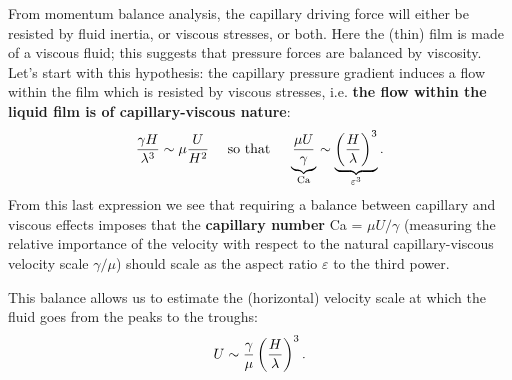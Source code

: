 From momentum balance analysis, the capillary driving force will either be resisted by fluid inertia, or viscous stresses, or both. Here the (thin) film is made of a viscous fluid; this suggests that pressure forces are balanced by viscosity. Let's start with this hypothesis: the capillary pressure gradient induces a flow within the film which is resisted by viscous stresses, i.e. \textbf{the flow within the liquid film is of capillary-viscous nature}:
\begin{equation}
\frac{\gamma H}{\lambda^3} \sim \mu \frac{U}{H^2} \quad\text{ so that }\quad\underbrace{\frac{\mu U}{\gamma}}_\text{Ca} \sim \underbrace{\left( \frac{H}{\lambda}\right)^3}_{\varepsilon^3}.
\end{equation}
From this last expression we see that requiring a balance between capillary and viscous effects imposes that the \textbf{capillary number} Ca = $\mu U/\gamma$ (measuring the relative importance of the velocity with respect to the natural capillary-viscous velocity scale $\gamma/\mu$) should scale as the aspect ratio $\varepsilon$ to the third power.

This balance allows us to estimate the (horizontal) velocity scale at which the fluid goes from the peaks to the troughs:
\begin{equation}
U\sim\frac{\gamma}{\mu}\left(\frac{H}{\lambda}\right)^3.
\end{equation}

